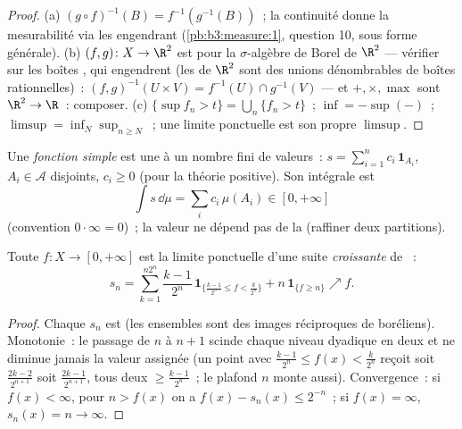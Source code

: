 \begin{proof}
(a) $(g\circ f)^{-1}(B) = f^{-1}(g^{-1}(B))$~; la continuité
donne la mesurabilité via les  engendrant
(\cref{pb:b3:measure:1}, question 10, sous forme générale).
(b) $(f, g) \colon X \to \R^2$ est  pour la
$\sigma$-algèbre de Borel de $\R^2$ --- vérifier sur les
boîtes , qui engendrent (les  de $\R^2$ sont
des unions dénombrables de boîtes rationnelles)~:
$(f,g)^{-1}(U\times V) = f^{-1}(U)\cap g^{-1}(V)$ --- et
$+, \times, \max$ sont  $\R^2 \to \R$~: composer.
(c) $\{\sup f_n > t\} = \bigcup_n\{f_n > t\}$~; $\inf =
-\sup(-)$~; $\limsup = \inf_N\sup_{n \geq N}$~; une limite
ponctuelle est son propre $\limsup$.
\end{proof}

\begin{definition}\label{def:b3:lebesgue:simple}
Une \emph{fonction simple} est une
 à un nombre fini de valeurs~: $s =
\sum_{i=1}^n c_i\,\mathbf 1_{A_i}$, $A_i \in \mathcal A$
disjoints, $c_i \geq 0$ (pour la théorie positive). Son
intégrale est
\[
\int s\,\dd\mu = \sum_i c_i\,\mu(A_i) \in [0, +\infty]
\]
(convention $0\cdot\infty = 0$)~; la valeur ne dépend pas de
la  (raffiner deux partitions).
\end{definition}

\begin{theorem}
\label{thm:b3:lebesgue:approximation}
Toute $f \colon X \to [0, +\infty]$  est la limite
ponctuelle d'une suite \emph{croissante} de ~:
\[
s_n = \sum_{k=1}^{n2^n} \frac{k-1}{2^n}\,
\mathbf 1_{\{\frac{k-1}{2^n} \leq f < \frac k{2^n}\}}
+ n\,\mathbf 1_{\{f \geq n\}} \nearrow f .
\]
\end{theorem}

\begin{proof}
Chaque $s_n$ est  (les ensembles sont des images
réciproques de boréliens). Monotonie~: le passage de $n$ à
$n+1$ scinde chaque niveau dyadique en deux et ne diminue
jamais la valeur assignée (un point avec $\frac{k-1}{2^n}
\leq f(x) < \frac k{2^n}$ reçoit soit $\frac{2k-2}{2^{n+1}}$
soit $\frac{2k-1}{2^{n+1}}$, tous deux $\geq
\frac{k-1}{2^n}$~; le plafond $n$ monte aussi). Convergence~:
si $f(x) < \infty$, pour $n > f(x)$ on a $f(x) - s_n(x)
\leq 2^{-n}$~; si $f(x) = \infty$, $s_n(x) = n \to \infty$.
\end{proof}

